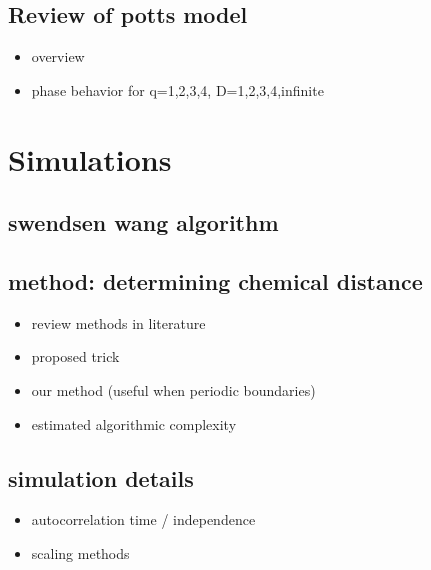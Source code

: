 \documentclass{umthesis}
\begin{document}
\subsection{Review of potts model}
\label{sec-3.1.3}
\begin{itemize}

\item overview\\
\label{sec-3.1.3.1}%
\item phase behavior for q=1,2,3,4, D=1,2,3,4,infinite\\
\label{sec-3.1.3.2}%
\end{itemize} %
\section{Simulations}
\label{sec-3.2}
\subsection{swendsen wang algorithm}
\label{sec-3.2.1}
\subsection{method: determining chemical distance}
\label{sec-3.2.2}
\begin{itemize}

\item review methods in literature\\
\label{sec-3.2.2.1}%
\item proposed trick\\
\label{sec-3.2.2.2}%
\item our method (useful when periodic boundaries)\\
\label{sec-3.2.2.3}%
\item estimated algorithmic complexity\\
\label{sec-3.2.2.4}%
\end{itemize} %
\subsection{simulation details}
\label{sec-3.2.3}
\begin{itemize}

\item autocorrelation time / independence\\
\label{sec-3.2.3.1}%
\item scaling methods\\
\label{sec-3.2.3.2}%
\end{itemize} %
\end{document}
